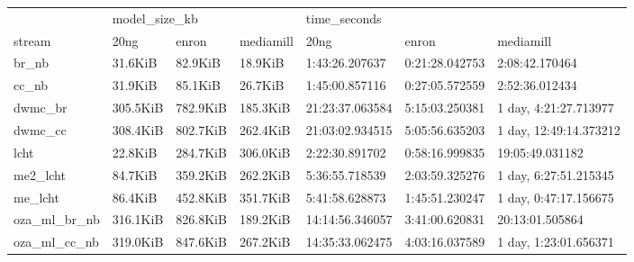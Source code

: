 \begin{tabular}{lllllll}
	\toprule
	                & \multicolumn{3}{l}{model\_size\_kb} & \multicolumn{3}{l}{time\_seconds}                                                                         \\
	stream          & 20ng                                & enron                             & mediamill & 20ng            & enron          & mediamill              \\
	\midrule
	br\_nb          & 31.6KiB                             & 82.9KiB                           & 18.9KiB   & 1:43:26.207637  & 0:21:28.042753 & 2:08:42.170464         \\
	cc\_nb          & 31.9KiB                             & 85.1KiB                           & 26.7KiB   & 1:45:00.857116  & 0:27:05.572559 & 2:52:36.012434         \\
	dwmc\_br        & 305.5KiB                            & 782.9KiB                          & 185.3KiB  & 21:23:37.063584 & 5:15:03.250381 & 1 day, 4:21:27.713977  \\
	dwmc\_cc        & 308.4KiB                            & 802.7KiB                          & 262.4KiB  & 21:03:02.934515 & 5:05:56.635203 & 1 day, 12:49:14.373212 \\
	lcht            & 22.8KiB                             & 284.7KiB                          & 306.0KiB  & 2:22:30.891702  & 0:58:16.999835 & 19:05:49.031182        \\
	me2\_lcht       & 84.7KiB                             & 359.2KiB                          & 262.2KiB  & 5:36:55.718539  & 2:03:59.325276 & 1 day, 6:27:51.215345  \\
	me\_lcht        & 86.4KiB                             & 452.8KiB                          & 351.7KiB  & 5:41:58.628873  & 1:45:51.230247 & 1 day, 0:47:17.156675  \\
	oza\_ml\_br\_nb & 316.1KiB                            & 826.8KiB                          & 189.2KiB  & 14:14:56.346057 & 3:41:00.620831 & 20:13:01.505864        \\
	oza\_ml\_cc\_nb & 319.0KiB                            & 847.6KiB                          & 267.2KiB  & 14:35:33.062475 & 4:03:16.037589 & 1 day, 1:23:01.656371  \\
	\bottomrule
\end{tabular}

